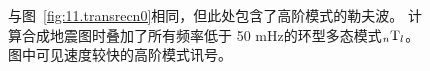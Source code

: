 \begin{figure}[!t]
\begin{center}
\end{center}
\caption[transverse record sections]{
\label{fig:11.transrec}
与图~\ref{fig:11.transrecn0}相同，但此处包含了高阶模式的勒夫波。
计算合成地震图时叠加了所有频率低于 50 mHz的环型多态模式${}_n{\rm T}_l$。
图中可见速度较快的高阶模式讯号。
}
\end{figure}

